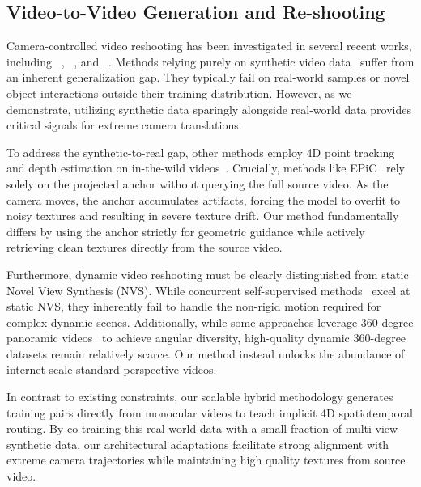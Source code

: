 \subsection{Video-to-Video Generation and Re-shooting}
Camera-controlled video reshooting has been investigated in several recent works, including \recammaster{}~\cite{bai2025recammaster}, \exfd{}~\cite{ex4d}, and \trajectorycrafter{}~\cite{yu2025trajectorycrafter}. Methods relying purely on synthetic video data~\cite{bai2025recammaster, gcd} suffer from an inherent generalization gap. They typically fail on real-world samples or novel object interactions outside their training distribution. However, as we demonstrate, utilizing synthetic data sparingly alongside real-world data provides critical signals for extreme camera translations.

To address the synthetic-to-real gap, other methods employ 4D point tracking and depth estimation on in-the-wild videos~\cite{ex4d,jeong2025reangle,chen2025reconstruct}. Crucially, methods like EPiC~\cite{wang2025epic} rely solely on the projected anchor without querying the full source video. As the camera moves, the anchor accumulates artifacts, forcing the model to overfit to noisy textures and resulting in severe texture drift. Our method fundamentally differs by using the anchor strictly for geometric guidance while actively retrieving clean textures directly from the source video.

Furthermore, dynamic video reshooting must be clearly distinguished from static Novel View Synthesis (NVS). While concurrent self-supervised methods~\cite{mitchel2026true,jiang2025rayzer} excel at static NVS, they inherently fail to handle the non-rigid motion required for complex dynamic scenes. Additionally, while some approaches leverage 360-degree panoramic videos~\cite{xia2025panowan,luo2025beyond} to achieve angular diversity, high-quality dynamic 360-degree datasets remain relatively scarce. Our method instead unlocks the abundance of internet-scale standard perspective videos.

In contrast to existing constraints, our scalable hybrid methodology generates training pairs directly from monocular videos to teach implicit 4D spatiotemporal routing. By co-training this real-world data with a small fraction of multi-view synthetic data, our architectural adaptations facilitate strong alignment with extreme camera trajectories while maintaining high quality textures from source video.